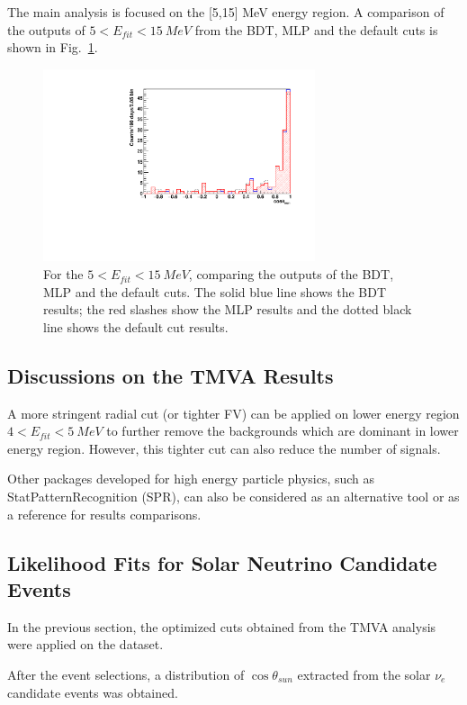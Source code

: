 

The main analysis is focused on the [5,15] MeV energy region. A comparison of the outputs of $5<E_{fit}<15~MeV$ from the BDT, MLP and the default cuts is shown in Fig.~\ref{compare_cosThetaToSun_5to15}.
\begin{figure}[!htb]
	\centering
	\includegraphics[width=8cm]{Compare_cosThetaSun_5to15.pdf}
	\caption{For the $5<E_{fit}<15~MeV$, comparing the outputs of the BDT, MLP and the default cuts. The solid blue line shows the BDT results; the red slashes show the MLP results and the dotted black line shows the default cut results.}
	\label{compare_cosThetaToSun_5to15}
\end{figure}

\subsection{Discussions on the TMVA Results}
A more stringent radial cut (or tighter FV) can be applied on lower energy region $4<E_{fit}<5~MeV$ to further remove the backgrounds which are dominant in lower energy region. However, this tighter cut can also reduce the number of signals.

Other packages developed for high energy particle physics, such as StatPatternRecognition (SPR)\cite{sprWebsite}, can also be considered as an alternative tool or as a reference for results comparisons. 

\subsection{Likelihood Fits for Solar Neutrino Candidate Events}
In the previous section, the optimized cuts obtained from the TMVA analysis were applied on the dataset. 

After the event selections, a distribution of $\cos\theta_{sun}$ extracted from the solar $\nu_e$ candidate events was obtained. 

